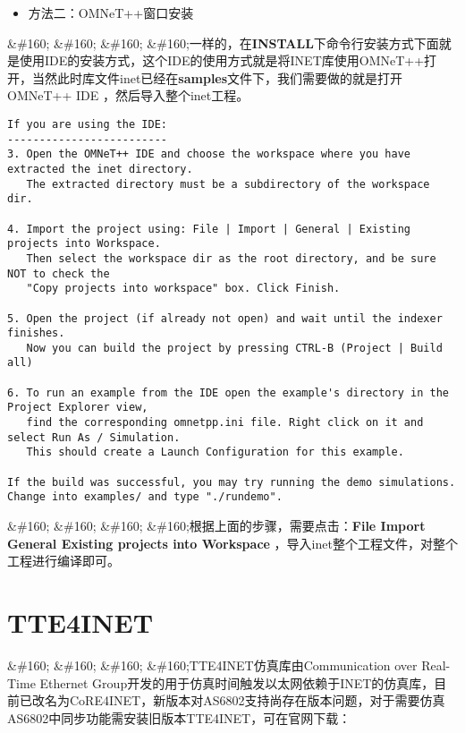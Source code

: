 \begin{itemize}
\item 方法二：OMNeT++窗口安装

\end{itemize}

\&\#160; \&\#160; \&\#160; \&\#160;一样的，在\textbf{INSTALL}下命令行安装方式下面就是使用IDE的安装方式，这个IDE的使用方式就是将INET库使用OMNeT++打开，当然此时库文件inet已经在\textbf{samples}文件下，我们需要做的就是打开OMNeT++ IDE ，然后导入整个inet工程。

\begin{verbatim}
If you are using the IDE:
-------------------------
3. Open the OMNeT++ IDE and choose the workspace where you have extracted the inet directory.
   The extracted directory must be a subdirectory of the workspace dir.

4. Import the project using: File | Import | General | Existing projects into Workspace.
   Then select the workspace dir as the root directory, and be sure NOT to check the
   "Copy projects into workspace" box. Click Finish.

5. Open the project (if already not open) and wait until the indexer finishes.
   Now you can build the project by pressing CTRL-B (Project | Build all)

6. To run an example from the IDE open the example's directory in the Project Explorer view,
   find the corresponding omnetpp.ini file. Right click on it and select Run As / Simulation.
   This should create a Launch Configuration for this example.

If the build was successful, you may try running the demo simulations.
Change into examples/ and type "./rundemo".

\end{verbatim}

\&\#160; \&\#160; \&\#160; \&\#160;根据上面的步骤，需要点击：\textbf{File \textbar{} Import \textbar{} General \textbar{} Existing projects into Workspace} ，导入inet整个工程文件，对整个工程进行编译即可。

\section{TTE4INET}
\label{tte4inet}

\&\#160; \&\#160; \&\#160; \&\#160;TTE4INET仿真库由Communication over Real-Time Ethernet Group开发的用于仿真时间触发以太网依赖于INET的仿真库，目前已改名为CoRE4INET，新版本对AS6802支持尚存在版本问题，对于需要仿真AS6802中同步功能需安装旧版本TTE4INET，可在官网下载：

